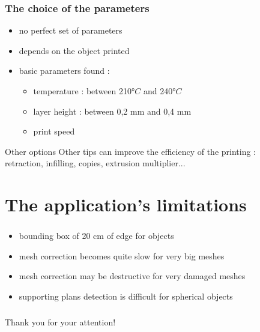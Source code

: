 \documentclass{beamer}
\begin{document}
\begin{frame}
	\frametitle{The choice of the parameters}

	\begin{block}{}
	\begin{itemize}
	\item no perfect set of parameters
	\item depends on the object printed
	\item basic parameters found :
		\begin{itemize}
		\item temperature : between 210$°C$ and 240$°C$
		\item layer height : between 0,2 mm  and 0,4 mm
		\item print speed
		\end{itemize}
	\end{itemize}	
    \end{block}
    
    \begin{block}{Other options}
    Other tips can improve the efficiency of the printing :	\\
    retraction, infilling, copies, extrusion multiplier...
    \end{block}
\end{frame}

\section{The application's limitations}
\begin{frame}
	\frametitle{}
	\begin{block}{}
    \begin{itemize}
    \item bounding box of 20 cm of edge for objects
    \item mesh correction becomes quite slow for very big meshes
    \item mesh correction may be destructive for very damaged meshes
    \item supporting plans detection is difficult for spherical objects 
    \end{itemize}
    \end{block}
\end{frame}

\begin{frame}
	\frametitle{}

    \begin{center}
    \Large{Thank you for your attention!}
    \end{center}
\end{frame}
	
\end{document}
